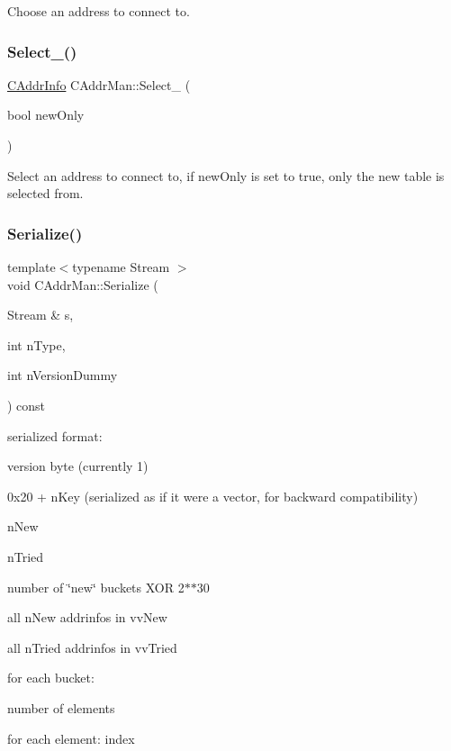 Choose an address to connect to. \mbox{\label{class_c_addr_man_a27e51ef4fe86db1ff5a5e45caefc1ef4}} 
\subsubsection{\texorpdfstring{Select\+\_\+()}{Select\_()}}
{\footnotesize\ttfamily \mbox{\hyperlink{class_c_addr_info}{C\+Addr\+Info}} C\+Addr\+Man\+::\+Select\+\_\+ (\begin{DoxyParamCaption}\item[{bool}]{new\+Only }\end{DoxyParamCaption})\hspace{0.3cm}{\ttfamily [protected]}}



Select an address to connect to, if new\+Only is set to true, only the new table is selected from. 

\mbox{\label{class_c_addr_man_a08668d8cf435750a80316b4708bbc9eb}} 
\subsubsection{\texorpdfstring{Serialize()}{Serialize()}}
{\footnotesize\ttfamily template$<$typename Stream $>$ \\
void C\+Addr\+Man\+::\+Serialize (\begin{DoxyParamCaption}\item[{Stream \&}]{s,  }\item[{int}]{n\+Type,  }\item[{int}]{n\+Version\+Dummy }\end{DoxyParamCaption}) const\hspace{0.3cm}{\ttfamily [inline]}}

serialized format\+:
\begin{DoxyItemize}
\item version byte (currently 1)
\item 0x20 + n\+Key (serialized as if it were a vector, for backward compatibility)
\item n\+New
\item n\+Tried
\item number of \char`\"{}new\char`\"{} buckets X\+OR 2$\ast$$\ast$30
\item all n\+New addrinfos in vv\+New
\item all n\+Tried addrinfos in vv\+Tried
\item for each bucket\+:
\begin{DoxyItemize}
\item number of elements
\item for each element\+: index
\end{DoxyItemize}
\end{DoxyItemize}

